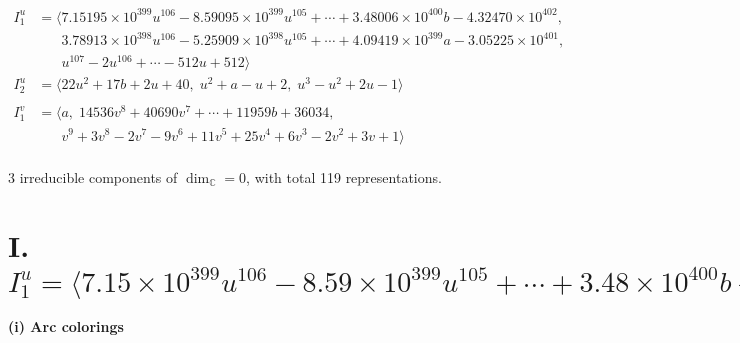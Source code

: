 \documentclass[1p]{elsarticle_modified}
\theoremstyle{definition}
\begin{document}
\begin{align*}
I^u_{1}&=\langle 
7.15195\times10^{399} u^{106}-8.59095\times10^{399} u^{105}+\cdots+3.48006\times10^{400} b-4.32470\times10^{402},\\
\phantom{I^u_{1}}&\phantom{= \langle  }3.78913\times10^{398} u^{106}-5.25909\times10^{398} u^{105}+\cdots+4.09419\times10^{399} a-3.05225\times10^{401},\\
\phantom{I^u_{1}}&\phantom{= \langle  }u^{107}-2 u^{106}+\cdots-512 u+512\rangle \\
I^u_{2}&=\langle 
22 u^2+17 b+2 u+40,\;u^2+a- u+2,\;u^3- u^2+2 u-1\rangle \\
\\
I^v_{1}&=\langle 
a,\;14536 v^8+40690 v^7+\cdots+11959 b+36034,\\
\phantom{I^v_{1}}&\phantom{= \langle  }v^9+3 v^8-2 v^7-9 v^6+11 v^5+25 v^4+6 v^3-2 v^2+3 v+1\rangle \\
\end{align*}
\raggedright * 3 irreducible components of $\dim_{\mathbb{C}}=0$, with total 119 representations.\\
\newpage
\renewcommand{\arraystretch}{1}
\centering \section*{I. $I^u_{1}= \langle 7.15\times10^{399} u^{106}-8.59\times10^{399} u^{105}+\cdots+3.48\times10^{400} b-4.32\times10^{402},\;3.79\times10^{398} u^{106}-5.26\times10^{398} u^{105}+\cdots+4.09\times10^{399} a-3.05\times10^{401},\;u^{107}-2 u^{106}+\cdots-512 u+512 \rangle$}
\flushleft \textbf{(i) Arc colorings}\\
\end{document}
